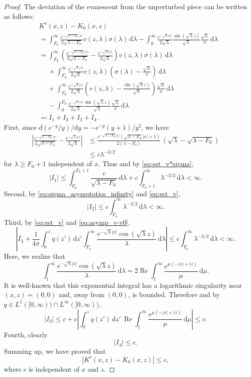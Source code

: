 \documentclass[10pt,a4paper]{amsart}
\DeclareMathOperator{\Real}{Re}
\newcommand{\dd}{\mathrm d}
\begin{document}
\begin{proof}
	The deviation of the evanescent from the unperturbed piece can be written as follows:
	\begin{align*}
		&K^{\mathrm{e}}(x,z) - K_0(x,z) \\
		&= \int_{F_0}^\infty\frac{e^{-\sqrt{\lambda-F_0}|x|}}{2\sqrt{\lambda-F_0}}v(z,\lambda)\sigma(\lambda)\,\dd\lambda - \int_0^\infty \frac{e^{-\sqrt\lambda|x|}}{2\sqrt\lambda}\frac{\sin(\sqrt\lambda z)}{\sqrt\lambda}\frac{\sqrt\lambda}{\pi}\,\dd\lambda\\
		&= \int_{F_0}^\infty\left(\frac{e^{-\sqrt{\lambda-F_0}|x|}}{2\sqrt{\lambda-F_0}}-\frac{e^{-\sqrt\lambda|x|}}{2\sqrt\lambda}\right)v(z,\lambda)\sigma(\lambda)\,\dd\lambda\\
		&\quad\;+\int_{F_0}^\infty \frac{e^{-\sqrt\lambda|x|}}{2\sqrt\lambda}v(z,\lambda)\left(\sigma(\lambda)-\frac{\sqrt\lambda}{\pi}\right)\,\dd\lambda\\
		&\quad\;+\int_{F_0}^\infty \frac{e^{-\sqrt\lambda|x|}}{2\sqrt\lambda}\left(v(z,\lambda)-\frac{\sin(\sqrt\lambda z)}{\sqrt\lambda}\right)\frac{\sqrt\lambda}{\pi}\,\dd\lambda\\
		&\quad\;-\int_0^{F_0} \frac{e^{-\sqrt\lambda|x|}}{2\sqrt\lambda}\frac{\sin(\sqrt\lambda z)}{\sqrt\lambda}\frac{\sqrt\lambda}{\pi}\,\dd\lambda\\
		&\eqqcolon I_1+I_2+I_3+I_4.
	\end{align*}
	First, since $\dd(e^{-y}/y)/\dd y=-e^{-y}(y+1)/y^2$, we have
	\begin{align*}
		\left|\frac{e^{-\sqrt{\lambda-F_0}|x|}}{2\sqrt{\lambda-F_0}}-\frac{e^{-\sqrt\lambda|x|}}{2\sqrt\lambda}\right| &\le \frac{e^{-\sqrt{\lambda-F_0}|x|}(\sqrt{\lambda-F_0}|x|+1)}{2(\lambda-F_0)}\, (\sqrt\lambda-\sqrt{\lambda-F_0}) \\
		&\le c\lambda^{-3/2}
	\end{align*}
	for $\lambda\ge F_0+1$ independent of $x$. Thus and by \eqref{eq:est_v*sigma},
	\[|I_1| \le \int_{F_0}^{F_0+1} \frac{c}{\sqrt{\lambda-F_0}}\,\dd\lambda + c\int_{F_0+1}^\infty \lambda^{-3/2} \,\dd\lambda < \infty.\]
	Second, by \eqref{eq:sigma_asymptotics_infinity} and \eqref{eq:est_v},
	\[|I_2| \le c \int_{F_0}^\infty \lambda^{-3/2}\,\dd\lambda < \infty.\]
	Third, by \eqref{eq:est_v} and \eqref{eq:asymp_v-v0},
	\[\left|I_3 + \frac{1}{4\pi} \int_0^z q(z')\,\dd z' \int_{F_0}^\infty \frac{e^{-\sqrt\lambda|x|} \cos(\sqrt\lambda z)}{\lambda} \,\dd\lambda\right| \le c \int_{F_0}^\infty \lambda^{-3/2}\,\dd\lambda < \infty.\]
	Here, we realize that
	\[\int_1^\infty \frac{e^{-\sqrt\lambda|x|} \cos(\sqrt\lambda z)}{\lambda} \,\dd\lambda = 2\Real \int_1^\infty \frac{e^{\mu(-|x|+iz)}}{\mu} \,\dd\mu.\]
	It is well-known that this exponential integral has a logarithmic singularity near $(x,z)=(0,0)$ and, away from $(0,0)$, is bounded. Therefore and by $q\in L^1([0,\infty))\cap L^\infty([0,\infty))$,
	\[|I_3| \le c + c\left|\int_0^z q(z')\,\dd z' \, \Real \int_1^\infty \frac{e^{\mu(-|x|+iz)}}{\mu} \,\dd\mu\right| \le c.\]
	Fourth, clearly
	\[|I_4| \le c.\]
	Summing up, we have proved that
	\[|K^{\mathrm{e}}(x,z) - K_0(x,z)| \le c,\]
	where $c$ is independent of $x$ and $z$.
	

\end{proof}
\end{document}

